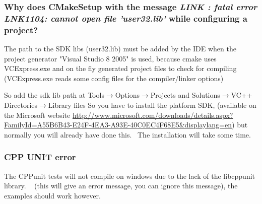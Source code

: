 \documentclass[a4paper,10pt]{article}
\begin{document}
\subsubsection{Why does CMakeSetup with the message \emph{LINK : fatal error LNK1104: cannot open 
file 'user32.lib'} while configuring a project?}
The path to the SDK libs (user32.lib) must be added by the IDE when the 
project generator "Visual Studio 8 2005" is used, because cmake uses 
VCExpress.exe and on the fly generated project files to check for compiling 
(VCExpress.exe reads some config files for the compiler/linker options) 

So add the sdk lib path  at Tools$\rightarrow$Options$\rightarrow$Projects and Solutions$\rightarrow$VC++ Directories$\rightarrow$Library files
So you have to install the platform SDK, (available on the Microsoft website \url{http://www.microsoft.com/downloads/details.aspx?FamilyId=A55B6B43-E24F-4EA3-A93E-40C0EC4F68E5&displaylang=en}) but 
normally you will already have done this.  The installation will take some 
time.

\subsubsection{CPP UNIT error}
The CPPunit tests will not compile on windows due to the lack of the libcppunit  library.   (this will give an error message, you can ignore this message), the examples should work however.
\end{document}
